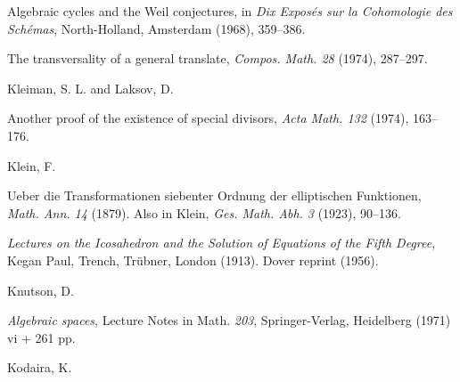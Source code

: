 {\noindent\hangindent=25bp\hspace*{6bp}%
Algebraic cycles and the Weil conjectures, in \emph{Dix Expos\'es sur la Cohomologie des Sch\'emas}, North-Holland, Amsterdam (1968), 359--386.\par
\noindent\hangindent=25bp\hspace*{6bp}%
The transversality of a general translate, \emph{Compos. Math. 28} (1974), 287--297.\par
\par\vspace{2.15pt}\noindent \hypertarget{bib-478-11}{}Kleiman, S. L. and Laksov, D.\par
\noindent\hangindent=25bp\hspace*{6bp}%
Another proof of the existence of special divisors, \emph{Acta Math. 132} (1974), 163--176.\par
\par\vspace{2.15pt}\noindent \hypertarget{bib-478-12}{}Klein, F.\par
\noindent\hangindent=25bp\hspace*{6bp}%
Ueber die Transformationen siebenter Ordnung der elliptischen Funktionen, \emph{Math. Ann. 14} (1879). Also in Klein, \emph{Ges. Math. Abh. 3} (1923), 90--136.\par
\noindent\hangindent=25bp\hspace*{6bp}%
\emph{Lectures on the Icosahedron and the Solution of Equations of the Fifth Degree}, Kegan Paul, Trench, Tr\"ubner, London (1913). Dover reprint (1956).\par
\par\vspace{2.15pt}\noindent \hypertarget{bib-478-14}{}Knutson, D.\par
\noindent\hangindent=25bp\hspace*{6bp}%
\emph{Algebraic spaces}, Lecture Notes in Math. \emph{203}, Springer-Verlag, Heidelberg (1971) vi + 261 pp.\par
\par\vspace{2.15pt}\noindent \hypertarget{bib-478-15}{}Kodaira, K.\par
}
